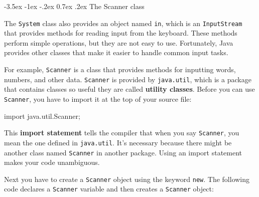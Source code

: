 \documentclass[12pt]{book}
\makeatletter
\theoremstyle{exercise}
\newcommand{\java}[1]{\verb"#1"}
\renewcommand{\section}{\@startsection {section}{1}{\z@}%
    {-3.5ex \@plus -1ex \@minus -.2ex}%
    {0.7ex \@plus.2ex}%
    {\normalfont\Large\bfseries}}
\newcommand{\java}[1]{\lstinline{#1}} %
\makeatother
\begin{document}
\section{The Scanner class}


%

The \java{System} class also provides an object named \java{in}, which is an \java{InputStream} that provides methods for reading input from the keyboard.
These methods perform simple operations, but they are not easy to use.
Fortunately, Java provides other classes that make it easier to handle common input tasks.


For example, \java{Scanner} is a class that provides methods for inputting words, numbers, and other data.
\java{Scanner} is provided by \java{java.util}, which is a package that contains classes so useful they are called {\bf utility classes}.
Before you can use \java{Scanner}, you have to import it at the top of your source file:

\begin{code}
import java.util.Scanner;
\end{code}


This {\bf import statement} tells the compiler that when you say \java{Scanner}, you mean the one defined in \java{java.util}.
It's necessary because there might be another class named \java{Scanner} in another package.
Using an import statement makes your code unambiguous.

Next you have to create a \java{Scanner} object using the keyword \java{new}.
The following code declares a \java{Scanner} variable and then creates a \java{Scanner} object:
\end{document}
